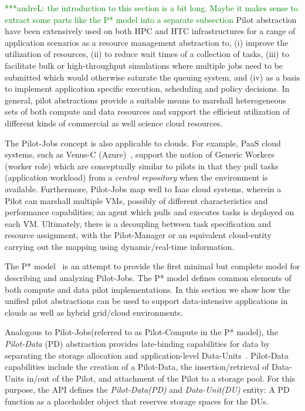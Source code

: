 \documentclass[times]{cpeauth}
\newcommand{\alnote}[1]{ {\textcolor{green} { ***andreL: #1 }}}
\newcommand{\alnote}[1]{}
\newcommand{\pilot}{Pilot\xspace}
\newcommand{\pilotjobs}{Pilot-Jobs\xspace}
\newcommand{\pilotcompute}{Pilot-Compute\xspace}
\newcommand{\pilotdata}{Pilot-Data\xspace}
\newcommand{\pd}{PD\xspace}
\newcommand{\dataunit}{Data-Unit\xspace}
\newcommand{\dataunits}{Data-Units\xspace}
\newcommand{\dus}{DUs\xspace}
\begin{document}
\alnote{the introduction to this section is a bit long. Maybe it makes sense to extract some parts like the P* model into a separate subsection}
\pilot abstraction have been extensively used on both HPC and HTC
infrastructures for a range of application scenarios as a resource
management abstraction to, (i) improve the utilization of resources,
(ii) to reduce wait times of a collection of tasks, (iii) to
facilitate bulk or high-throughput simulations where multiple jobs
need to be submitted which would otherwise saturate the queuing
system, and (iv) as a basis to implement application specific
execution, scheduling and policy decisions.  In general, pilot
abstractions provide a suitable means to marshall heterogeneous sets
of both compute and data resources and support the efficient
utilization of different kinds of commercial as well science cloud
resources.  

The \pilotjobs concept is also applicable to clouds. For example, PaaS
cloud systems, such as Venus-C (Azure)~\cite{venusc-generic-worker},
support the notion of Generic Workers (worker role) which are
conceptually similar to pilots in that they pull tasks (application
workload) from a {\it central repository} when the environment is
available. Furthermore, \pilotjobs map well to Iaas cloud systems,
wherein a \pilot can marshall multiple VMs, possibly of different
characteristics and performance capabilities; an agent which pulls and
executes tasks is deployed on each VM. Ultimately, there is a
decoupling between task specification and resource assignment, with
the \pilot-Manager or an equivalent cloud-entity carrying out the
mapping using dynamic/real-time information. 
 
The P* model~\cite{pstar12} is an attempt to provide the first minimal but
complete model for describing and analyzing \pilotjobs. The P* model defines
common elements of both compute and data pilot implementations. In this 
section we show how the unified pilot abstractions can be used to support 
data-intensive applications in clouds as well as hybrid grid/cloud 
environments.

Analogous to \pilotjobs (referred to as \pilotcompute in the P* model), the
{\it Pilot-Data} (PD) abstraction provides late-binding capabilities for data
by separating the storage allocation and application-level
\dataunits~\cite{pstar12}. \pilotdata capabilities include the creation of a 
\pilotdata, the insertion/retrieval of Data-Units in/out of the \pilot, and 
attachment of the \pilot to a storage pool. For this purpose, the API defines 
the {\it \pilotdata (PD)} and {\it \dataunit (DU)} entity: A \pd function as a
placeholder object that reserves storage spaces for the \dus. 
\end{document}
